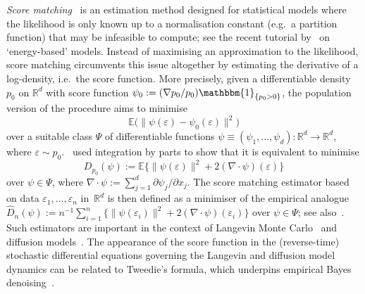 \documentclass[a4paper]{article}
\newcommand{\R}{\mathbb{R}}
\newcommand{\E}{\mathbb{E}}
\newcommand{\Ind}{\mathbbm{1}}
\newcommand{\norm}[1]{\|{#1}\|}
\theoremstyle{definition}
\begin{document}
\textit{Score matching}~\citep{hyvarinen05score,lyu2012interpretation} is an estimation method designed for statistical models where the likelihood is only known up to a normalisation constant (e.g.~a partition function) that may be infeasible to compute; see the recent tutorial by~\citet{song2021train} on `energy-based' models. Instead of maximising an approximation to the likelihood, score matching circumvents this issue altogether by estimating the derivative of a log-density, i.e.~the score function. More precisely, given a differentiable density $p_0$ on $\R^d$ with score function $\psi_0 := (\nabla p_0 / p_0)\Ind_{\{p_0 > 0\}}$, the population version of the procedure aims to minimise
\begin{equation}
\label{eq:score-matching-1}
\E\bigl(\norm{\psi(\varepsilon) - \psi_0(\varepsilon)}^2\bigr)
\end{equation}
over a suitable class $\Psi$ of differentiable functions $\psi \equiv (\psi_1,\dotsc,\psi_d) \colon \R^d \to \R^d$, where $\varepsilon \sim p_0$.~\citet{hyvarinen05score} used integration by parts to show that it is equivalent to minimise 
\begin{equation}
\label{eq:score-matching-2}
D_{p_0}(\psi) := \E\bigl\{\norm{\psi(\varepsilon)}^2 + 2(\nabla \cdot \psi)(\varepsilon)\bigr\}
\end{equation}
over $\psi \in \Psi$, where $\nabla \cdot \psi := \sum_{j=1}^d \partial \psi_j/\partial x_j$. The score matching estimator based on data $\varepsilon_1,\dotsc,\varepsilon_n$ in~$\R^d$ is then defined as a minimiser of the empirical analogue $\hat{D}_n(\psi) := n^{-1}\sum_{i=1}^n\{\norm{\psi(\varepsilon_i)}^2 + 2(\nabla \cdot \psi)(\varepsilon_i)\}$ over $\psi \in \Psi$; see also~\citet{cox1985penalty}.  Such estimators are important in the context of Langevin Monte Carlo~\citep{parisi1981correlation,roberts1996exponential,betancourt2017geometric,cheng2018underdamped} and diffusion models~\citep{li2024towards}. The appearance of the score function in the (reverse-time) stochastic differential equations governing the Langevin and diffusion model dynamics can be related to Tweedie's formula, which underpins empirical Bayes denoising~\citep{efron2011tweedie,derenski23empirical}.
\end{document}
